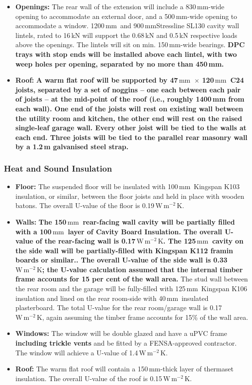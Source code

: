 \documentclass{extension}
\newcommand{\mm}{\,$\mathrm{mm}$}
\newcommand{\uunit}{\,$\mathrm{W\,m^{-2}\,K}$}
\begin{document}
\begin{itemize}
  \item {\bf Openings:} The rear wall of the extension will include a 830\mm -wide opening to accommodate an external door, and a 500\mm -wide opening to accommodate a window. 1200\mm\ and 900\mm Stressline SL130 cavity wall lintels\cite{esteel}, rated to 16\,kN will support the 0.68\,kN and 0.5\,kN respective loads above the openings. The lintels will sit on min. 150\mm -wide bearings. {\bf DPC trays with stop ends will be installed above each lintel, with two weep holes per opening, separated by no more than 450\,mm.}
  \item {\bf Roof:} {\bf A warm flat roof will be supported by 47\mm\ $\times$ 120\mm\ C24 joists, separated by a set of noggins -- one each between each pair of joists -- at the mid-point of the roof (i.e., roughly 1400\,mm from each wall). One end of the joists will rest on existing wall between the utility room and kitchen, the other end will rest on the raised single-leaf garage wall. Every other joist will be tied to the walls at each end. Three joists will be tied to the parallel rear masonry wall by a 1.2\,m galvanised steel strap.}
\end{itemize}

\subsubsection{Heat and Sound Insulation}
\begin{itemize}
  \item {\bf Floor:} The suspended floor will be insulated with 100\mm\ Kingspan K103 insulation, or similar, between the floor joists and held in place with wooden batons. The overall U-value of the floor is 0.19\uunit .
  \item {\bf Walls:} {\bf The 150\mm\ rear-facing wall cavity will be partially filled with a 100\mm\ layer of Cavity Board Insulation.\cite{uw1ins} The overall U-value of the rear-facing wall is 0.17\uunit . The 125\mm\ cavity on the side wall will be partially-filled with Kingspan K112 framin boards or similar.\cite{uw2ins}. The overall U-value of the side wall is 0.33\uunit ; the U-value calculation assumed that the internal timber frame accounts for 15 per cent of the wall area.} The stud wall between the rear room and the garage will be fully-filled with 125\mm\ Kingspan K106\cite{uw3ins} insulation and lined on the rear room-side with 40\mm\ insulated plasterboard.\cite{uw4ins} The total U-value for the rear room/garage wall is 0.17\uunit , again assuming the timber frame accounts for 15\% of the wall area.
  \item {\bf Windows:} The window will be double glazed and have a uPVC frame {\bf including trickle vents} and be fitted by a FENSA-approved contractor. The window will achieve a U-value of 1.4\uunit .
  \item {\bf Roof:} The warm flat roof will contain a 150\mm -thick layer of thermaset insulation.\cite{erins} The overall U-value of the roof is 0.15\uunit .
\end{itemize}
\end{document}
